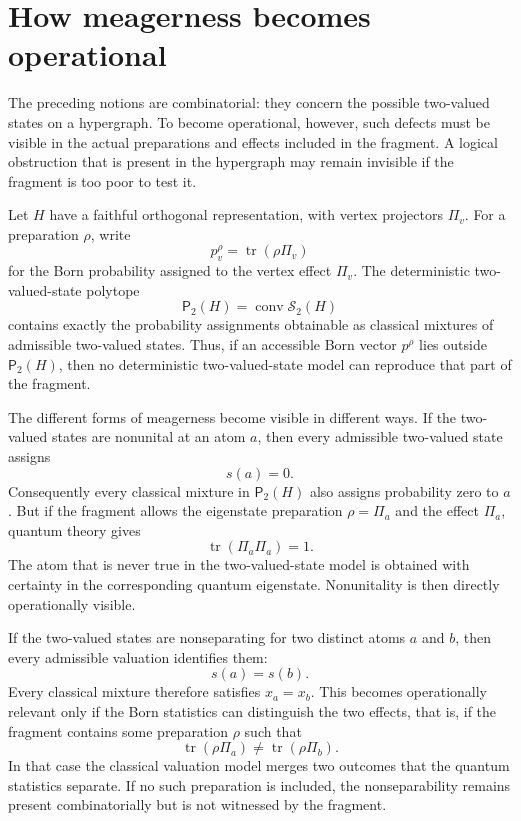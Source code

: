 \documentclass[aps,pra,twocolumn,superscriptaddress,nofootinbib]{revtex4-2}
\newcommand{\TVS}{\mathcal{S}_2}
\newcommand{\Ptwo}{\mathsf{P}_{2}}
\newcommand{\conv}{\operatorname{conv}}
\newcommand{\tr}{\operatorname{tr}}
\begin{document}
\section{How meagerness becomes operational}

The preceding notions are combinatorial: they concern the possible two-valued
states on a hypergraph.  To become operational, however, such defects must be
visible in the actual preparations and effects included in the fragment.  A
logical obstruction that is present in the hypergraph may remain invisible if
the fragment is too poor to test it.

Let $H$ have a faithful orthogonal representation, with vertex projectors
$\Pi_v$.  For a preparation $\rho$, write
\begin{equation}
        p^\rho_v=\tr(\rho\Pi_v)
\end{equation}
for the Born probability assigned to the vertex effect $\Pi_v$.  The
deterministic two-valued-state polytope
\begin{equation}
        \Ptwo(H)=\conv\TVS(H)
\end{equation}
contains exactly the probability assignments obtainable as classical mixtures
of admissible two-valued states.  Thus, if an accessible Born vector
$p^\rho$ lies outside $\Ptwo(H)$, then no deterministic two-valued-state
model can reproduce that part of the fragment.

The different forms of meagerness become visible in different ways.
If the two-valued states are nonunital at an atom $a$, then every admissible
two-valued state assigns
\begin{equation}
        s(a)=0.
\end{equation}
Consequently every classical mixture in $\Ptwo(H)$ also assigns probability
zero to $a$.  But if the fragment allows the eigenstate preparation
$\rho=\Pi_a$ and the effect $\Pi_a$, quantum theory gives
\begin{equation}
        \tr(\Pi_a\Pi_a)=1.
\end{equation}
The atom that is never true in the two-valued-state model is obtained with
certainty in the corresponding quantum eigenstate.  Nonunitality is then
directly operationally visible.

If the two-valued states are nonseparating for two distinct atoms $a$ and
$b$, then every admissible valuation identifies them:
\begin{equation}
        s(a)=s(b).
\end{equation}
Every classical mixture therefore satisfies $x_a=x_b$.  This becomes
operationally relevant only if the Born statistics can distinguish the two
effects, that is, if the fragment contains some preparation $\rho$ such that
\begin{equation}
        \tr(\rho\Pi_a)\ne \tr(\rho\Pi_b).
\end{equation}
In that case the classical valuation model merges two outcomes that the quantum
statistics separate.  If no such preparation is included, the nonseparability
remains present combinatorially but is not witnessed by the fragment.
\end{document}
